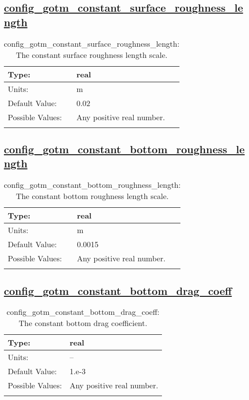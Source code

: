\subsection[config\_gotm\_constant\_surface\_roughness\_length]{\hyperref[sec:nm_tab_gotm]{config\_gotm\_constant\_surface\_roughness\_length}}
\label{subsec:nm_sec_config_gotm_constant_surface_roughness_length}
\begin{center}
\begin{longtable}{| p{2.0in} || p{4.0in} |}
    \hline
    Type: & real \\
    \hline
    Units: & \si{m} \\
    \hline
    Default Value: & 0.02 \\
    \hline
    Possible Values: & Any positive real number. \\
    \hline
    \caption{config\_gotm\_constant\_surface\_roughness\_length: The constant surface roughness length scale.}
\end{longtable}
\end{center}
\subsection[config\_gotm\_constant\_bottom\_roughness\_length]{\hyperref[sec:nm_tab_gotm]{config\_gotm\_constant\_bottom\_roughness\_length}}
\label{subsec:nm_sec_config_gotm_constant_bottom_roughness_length}
\begin{center}
\begin{longtable}{| p{2.0in} || p{4.0in} |}
    \hline
    Type: & real \\
    \hline
    Units: & \si{m} \\
    \hline
    Default Value: & 0.0015 \\
    \hline
    Possible Values: & Any positive real number. \\
    \hline
    \caption{config\_gotm\_constant\_bottom\_roughness\_length: The constant bottom roughness length scale.}
\end{longtable}
\end{center}
\subsection[config\_gotm\_constant\_bottom\_drag\_coeff]{\hyperref[sec:nm_tab_gotm]{config\_gotm\_constant\_bottom\_drag\_coeff}}
\label{subsec:nm_sec_config_gotm_constant_bottom_drag_coeff}
\begin{center}
\begin{longtable}{| p{2.0in} || p{4.0in} |}
    \hline
    Type: & real \\
    \hline
    Units: & -- \\
    \hline
    Default Value: & 1.e-3 \\
    \hline
    Possible Values: & Any positive real number. \\
    \hline
    \caption{config\_gotm\_constant\_bottom\_drag\_coeff: The constant bottom drag coefficient.}
\end{longtable}
\end{center}
